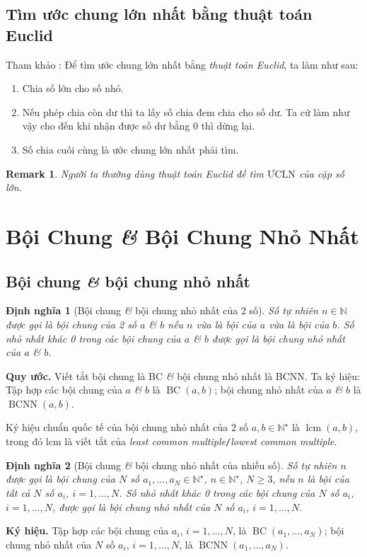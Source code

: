 \documentclass[oneside]{book}
\numberwithin{equation}{section}
\newtheorem{dinhnghia}{Định nghĩa}[section]
\newtheorem{remark}{Remark}[section]
\begin{document}
\subsection{Tìm ước chung lớn nhất bằng thuật toán Euclid}
Tham khảo \cite[p. 52]{Thai_Anh_Dat_Ha_Loan_Nam_Quang_Toan_6_tap_1}: Để tìm ước chung lớn nhất bằng \textit{thuật toán Euclid}, ta làm như sau:
\begin{enumerate}
	\item Chia số lớn cho số nhỏ.
	\item Nếu phép chia còn dư thì ta lấy số chia đem chia cho số dư. Ta cứ làm như vậy cho đến khi nhận được số dư bằng 0 thì dừng lại.
	\item Số chia cuối cùng là ước chung lớn nhất phải tìm.
\end{enumerate}

\begin{remark}
	Người ta thường dùng thuật toán Euclid đề tìm $\mbox{ƯCLN}$ của cặp số lớn.
\end{remark}

\section{Bội Chung \textit{\&} Bội Chung Nhỏ Nhất}

\subsection{Bội chung \textit{\&} bội chung nhỏ nhất}

\begin{dinhnghia}[Bội chung \textit{\&} bội chung nhỏ nhất của 2 số]
	Số tự nhiên $n\in\mathbb{N}$ được gọi là \emph{bội chung} của 2 số $a$ \textit{\&} $b$ nếu $n$ vừa là bội của $a$ vừa là bội của $b$. Số nhỏ nhất khác 0 trong các bội chung của $a$ \textit{\&} $b$ được gọi là \emph{bội chung nhỏ nhất} của $a$ \textit{\&} $b$.
\end{dinhnghia}
\noindent\textbf{Quy ước.} Viết tắt bội chung là BC \textit{\&} bội chung nhỏ nhất là BCNN. Ta ký hiệu: Tập hợp các bội chung của $a$ \textit{\&} $b$ là $\operatorname{BC}(a,b)$; bội chung nhỏ nhất của $a$ \textit{\&} $b$ là $\operatorname{BCNN}(a,b)$.  

Ký hiệu chuẩn quốc tế của bội chung nhỏ nhất của 2 số $a,b\in\mathbb{N}^\star$ là $\operatorname{lcm}(a,b)$, trong đó lcm là viết tắt của \textit{least common multiple}\texttt{/}\textit{lowest common multiple}.

\begin{dinhnghia}[Bội chung \textit{\&} bội chung nhỏ nhất của nhiều số]
	Số tự nhiên $n$ được gọi là \emph{bội chung} của $N$ số $a_1,\ldots,a_N\in\mathbb{N}^\star$, $n\in\mathbb{N}^\star$, $N\ge 3$, nếu $n$ là bội của tất cả $N$ số $a_i$, $i = 1,\ldots,N$. Số nhỏ nhất khác 0 trong các bội chung của $N$ số $a_i$, $i = 1,\ldots,N$, được gọi là \emph{bội chung nhỏ nhất} của $N$ số $a_i$, $i = 1,\ldots,N$.
\end{dinhnghia}
\noindent\textbf{Ký hiệu.} Tập hợp các bội chung của $a_i$, $i = 1,\ldots,N$, là $\operatorname{BC}(a_1,\ldots,a_N)$; bội chung nhỏ nhất của $N$ số $a_i$, $i = 1,\ldots,N$, là $\operatorname{BCNN}(a_1,\ldots,a_N)$.
\end{document}
